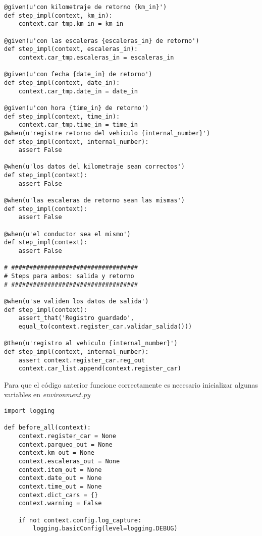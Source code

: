 {\begin{verbatim}
@given(u'con kilometraje de retorno {km_in}')
def step_impl(context, km_in):
    context.car_tmp.km_in = km_in

@given(u'con las escaleras {escaleras_in} de retorno')
def step_impl(context, escaleras_in):
    context.car_tmp.escaleras_in = escaleras_in

@given(u'con fecha {date_in} de retorno')
def step_impl(context, date_in):
    context.car_tmp.date_in = date_in

@given(u'con hora {time_in} de retorno')
def step_impl(context, time_in):
    context.car_tmp.time_in = time_in
@when(u'registre retorno del vehiculo {internal_number}')
def step_impl(context, internal_number):
    assert False

@when(u'los datos del kilometraje sean correctos')
def step_impl(context):
    assert False

@when(u'las escaleras de retorno sean las mismas')
def step_impl(context):
    assert False

@when(u'el conductor sea el mismo')
def step_impl(context):
    assert False

# ###################################
# Steps para ambos: salida y retorno
# ###################################

@when(u'se validen los datos de salida')
def step_impl(context):
    assert_that('Registro guardado',
    equal_to(context.register_car.validar_salida()))

@then(u'registro al vehiculo {internal_number}')
def step_impl(context, internal_number):
    assert context.register_car.reg_out
    context.car_list.append(context.register_car)

  \end{verbatim}
}

Para que el código anterior funcione correctamente es necesario inicializar
algunas variables en {\it environment.py}

{\scriptsize
  \begin{verbatim}
import logging

def before_all(context):
    context.register_car = None
    context.parqueo_out = None
    context.km_out = None
    context.escaleras_out = None
    context.item_out = None
    context.date_out = None
    context.time_out = None
    context.dict_cars = {}
    context.warning = False

    if not context.config.log_capture:
        logging.basicConfig(level=logging.DEBUG)
  \end{verbatim}
}

